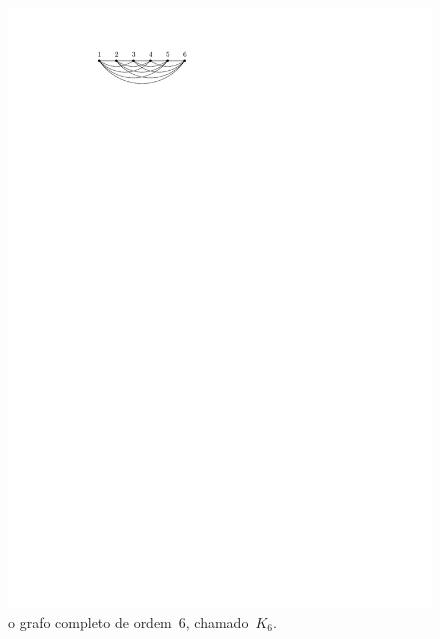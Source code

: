 \documentclass[12pt, a4paper]{article}
\theoremstyle{definition}
\begin{document}
\begin{figure}[H]
    \centering
    \includegraphics{completo.pdf}
    \caption{o grafo completo de ordem~$6$, chamado~$K_6$.}
    \label{fig:completo}
\end{figure}
\end{document}
